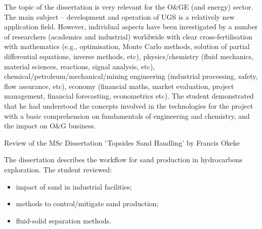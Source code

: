 \documentclass[14pt,twoside]{report}
\begin{document}
The topic of the dissertation is very relevant for the O$\&$GE (and energy) sector. The main subject -- development and operation of UGS is a relatively new application field. However, individual aspects have been investigated by a number of researchers (academics and industrial) worldwide with clear cross-fertilisation with mathematics (e.g., optimisation, Monte Carlo methods, solution of partial differential equations, inverse methods, etc), physics/chemistry (fluid mechanics, material sciences, reactions, signal analysis, etc), chemical/petroleum/mechanical/mining engineering (industrial processing, safety, flow assurance, etc), economy (financial maths, market evaluation, project management, financial forecasting, econometrics etc). The student demonstrated that he had understood the concepts involved in the technologies for the project with a basic comprehension on fundamentals of engineering and chemistry, and the impact on O$\&$G business.    




\clearpage


\medskip

\begin{center}
{\Large Review of the MSc Dissertation $\lq$Topsides Sand Handling' by Francis Okeke}
\end{center}

\medskip

The dissertation describes the workflow for sand production in hydrocarbons exploration. The student reviewed:
\begin{itemize}
%
\item impact of sand in industrial facilities;
%
\item methods to control/mitigate sand production;
%
\item fluid-solid separation methods.
%
\end{itemize}
\end{document}
